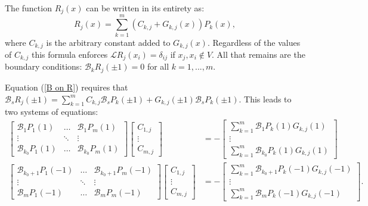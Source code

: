 \documentclass{article}
\begin{document}
The function $R_j(x)$ can be written in its entirety as:
\begin{equation}
R_j(x) = \sum_{k=1}^m (C_{k,j} + G_{k,j}(x) ) P_k(x) ,
\end{equation}
where $C_{k,j}$ is the arbitrary constant added to $G_{k,j}(x)$.
Regardless of the values of $C_{k,j}$ this formula enforces $\mathcal{L} R_j(x_i) = \delta_{ij}$ if $x_j, x_i \notin V$.
All that remains are the boundary conditions: $\mathcal{B}_k R_j( \pm 1) = 0$ for all $k = 1,...,m$.

Equation (\ref{B on R}) requires that $\mathcal{B}_s R_j(\pm 1) = \sum_{k=1}^m C_{k,j} \mathcal{B}_s P_k (\pm1) + G_{k,j} (\pm1) \mathcal{B}_s P_k(\pm1)$.
This leads to two systems of equations:
\begin{equation} \label{enforce bc}
\begin{aligned}
\begin{bmatrix} \mathcal{B}_1 P_1(1) & \dots &  \mathcal{B}_1 P_m(1) \\ \vdots & \ddots & \vdots \\  \mathcal{B}_{k_0} P_1(1) & \dots &  \mathcal{B}_{k_0} P_m(1)  \end{bmatrix}
\begin{bmatrix} C_{1,j} \\ \vdots \\ C_{m,j} \end{bmatrix}
& = - \begin{bmatrix} \sum_{k=1}^m \mathcal{B}_1 P_k(1) G_{k,j}(1) \\ \vdots \\ \sum_{k=1}^m \mathcal{B}_{k_0} P_k(1) G_{k,j}(1) \end{bmatrix} \\
\begin{bmatrix} \mathcal{B}_{k_0 + 1} P_1(-1) & \dots &  \mathcal{B}_{k_0+1} P_m(-1) \\ \vdots & \ddots & \vdots \\  \mathcal{B}_m P_1(-1) & \dots &  \mathcal{B}_m P_m(-1)  \end{bmatrix}
\begin{bmatrix} C_{1,j} \\ \vdots \\ C_{m,j} \end{bmatrix}
& = - \begin{bmatrix} \sum_{k=1}^m \mathcal{B}_{k_0+1} P_k(-1) G_{k,j}(-1) \\ \vdots \\ \sum_{k=1}^m \mathcal{B}_m P_k(-1) G_{k,j}(-1) \end{bmatrix} .
\end{aligned}
\end{equation}
\end{document}
